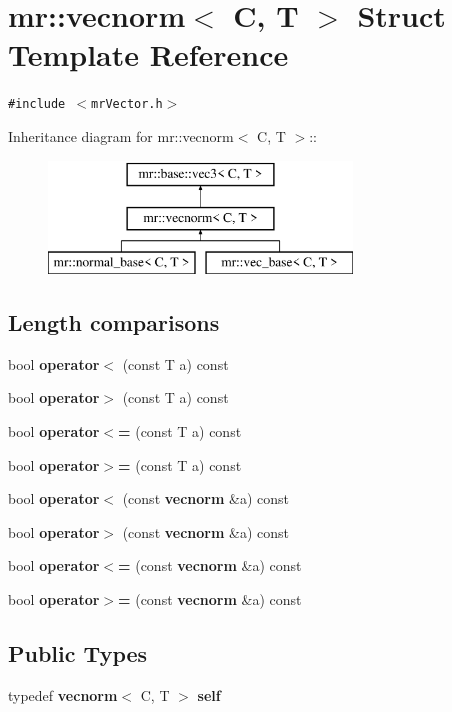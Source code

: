 \section{mr::vecnorm$<$ C, T $>$ Struct Template Reference}
\label{structmr_1_1vecnorm}
{\tt \#include $<$mr\-Vector.h$>$}

Inheritance diagram for mr::vecnorm$<$ C, T $>$::\begin{figure}[H]
\begin{center}
\leavevmode
\includegraphics[height=3cm]{structmr_1_1vecnorm}
\end{center}
\end{figure}
\subsection*{Length comparisons}
\begin{CompactItemize}
\item 
bool {\bf operator$<$} (const T a) const 
\item 
bool {\bf operator$>$} (const T a) const 
\item 
bool {\bf operator$<$=} (const T a) const 
\item 
bool {\bf operator$>$=} (const T a) const 
\item 
bool {\bf operator$<$} (const {\bf vecnorm} \&a) const 
\item 
bool {\bf operator$>$} (const {\bf vecnorm} \&a) const 
\item 
bool {\bf operator$<$=} (const {\bf vecnorm} \&a) const 
\item 
bool {\bf operator$>$=} (const {\bf vecnorm} \&a) const 
\end{CompactItemize}
\subsection*{Public Types}
\begin{CompactItemize}
\item 
typedef {\bf vecnorm}$<$ C, T $>$ {\bf self}
\end{CompactItemize}
